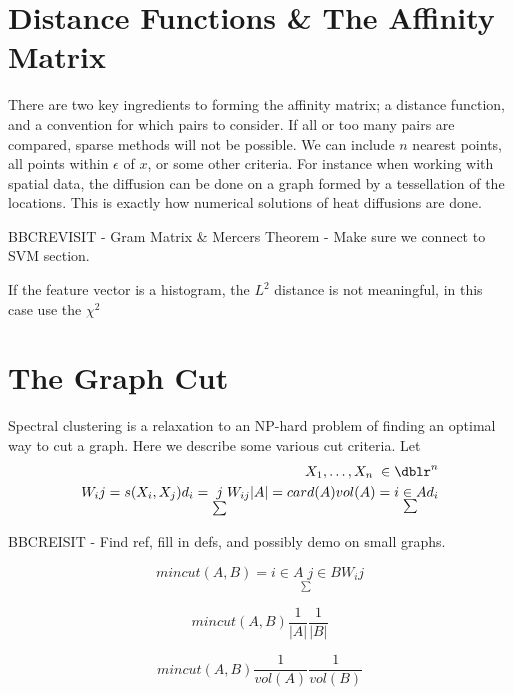\section{Distance Functions \& The Affinity Matrix}

There are two key ingredients to forming the affinity matrix; a distance function, and a convention for which pairs to consider.  If all or too many pairs are compared, sparse methods will not be possible.  We can include $n$ nearest points, all points within $\epsilon$ of $x$, or some other criteria. For instance when working with spatial data, the diffusion can be done on a graph formed by a tessellation of the locations.  This is exactly how numerical solutions of heat diffusions are done.

BBCREVISIT - Gram Matrix \& Mercers Theorem - Make sure we connect to SVM section.

If the feature vector is a histogram, the $L^2$ distance is not meaningful, in this case use the $\chi^2$

\section{The Graph Cut}
Spectral clustering is a relaxation to an NP-hard problem of finding an optimal way to cut a graph. Here we describe some various cut criteria.  Let
\begin{eqnarray*}
X_1, \hdots , X_n \; \in \dblr^n  \\
W_ij = s(X_i,X_j)
d_i = \underset{\sum}{j} W_{i j}
|A| = card (A)
vol(A) = \underset{\sum}{i \in A} d_i
\end{eqnarray*}

BBCREISIT - Find ref, fill in defs, and possibly demo on small graphs.
\begin{defn}
\begin{equation*} min cut(A,B) =\underset{\sum}{i \in A \; j \in B}  W_ij \end{equation*}
\end{defn}

\begin{defn}
\begin{equation*} min cut (A,B) \frac{1}{|A|} \frac{1}{|B|} \end{equation*}
\end{defn}

\begin{defn}[n Cut ]
\begin{equation*} min cut (A,B) \frac{1}{vol(A)} \frac{1}{vol(B)} \end{equation*}
\end{defn}



